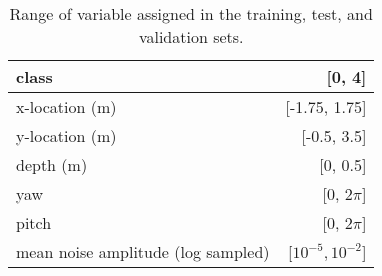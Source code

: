 \begin{table}
    \centering
    \begin{tabular}[htb]{|l|r|}
    \hline
    class & [0, 4] \\ \hline
    x-location (m) & [-1.75, 1.75] \\ \hline
    y-location (m) & [-0.5, 3.5] \\ \hline
    depth (m) & [0, 0.5] \\ \hline
    yaw & [0, 2$\pi$] \\ \hline
    pitch & [0, 2$\pi$] \\ \hline
    mean noise amplitude (log sampled) & [$10^{-5}, 10^{-2}$] \\ \hline
    \end{tabular}
    \caption{Range of variable assigned in the training, test, and validation sets.}
    \label{tab:parameter-ranges}
    \vspace{-0.5cm}
\end{table}
